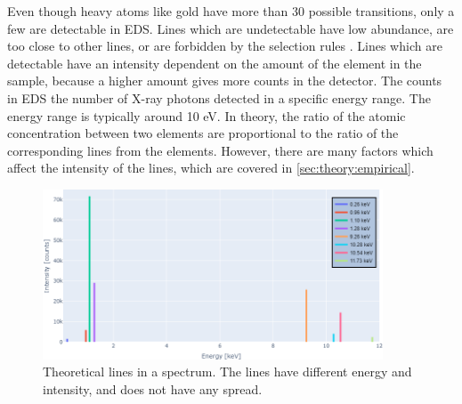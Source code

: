 Even though heavy atoms like gold have more than 30 possible transitions, only a few are detectable in EDS.
Lines which are undetectable have low abundance, are too close to other lines, or are forbidden by the selection rules \cite[Ch. 4.2.3]{goldstein_scanning_2018}.
Lines which are detectable have an intensity dependent on the amount of the element in the sample, because a higher amount gives more counts in the detector.
The counts in EDS the number of X-ray photons detected in a specific energy range.
The energy range is typically around 10 eV.
In theory, the ratio of the atomic concentration between two elements are proportional to the ratio of the corresponding lines from the elements.
However, there are many factors which affect the intensity of the lines, which are covered in \cref{sec:theory:empirical}.




\begin{figure}[p]
    \centering
    \includegraphics[width=0.9\textwidth]{figures/expected_lines.png}
    \caption{
        Theoretical lines in a spectrum.
        The lines have different energy and intensity, and does not have any spread.
    }
    \label{fig:theory:expected_lines}
\end{figure}

